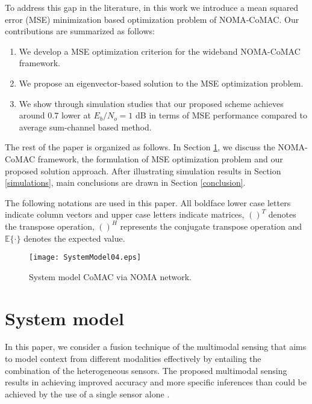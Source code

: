 \documentclass[journal]{IEEEtran}
\theoremstyle{definition}
\begin{document}
To address this gap in the literature, in this work we introduce a mean squared error (MSE) minimization based optimization problem of NOMA-CoMAC. Our contributions are summarized as follows:
      \vspace{-0.0cm}
      \begin{enumerate}[label=(\arabic*)]
\item  We develop a MSE optimization criterion for the wideband NOMA-CoMAC framework.
\item We propose an eigenvector-based solution to the MSE optimization problem. 
\item We show through simulation studies that our proposed scheme achieves around $0.7$ lower at $E_b/N_o = 1$ dB in terms of MSE performance compared to average sum-channel based method.
\end{enumerate}

	The rest of the paper is organized as follows. In Section \ref{SystemModel}, we discuss the NOMA-CoMAC framework, the formulation of MSE optimization problem and our proposed solution approach. After illustrating simulation results in Section \ref{simulations}, main conclusions are drawn in Section \ref{conclusion}.
	
	The following notations are used in this paper. All boldface lower
	case letters indicate column vectors and upper case letters indicate
	matrices, $()^T$ denotes the transpose operation, $()^H$ represents the conjugate transpose operation and $\mathbb{E} \{ \cdot \}$ denotes the expected value.
%	


	\begin{figure*}
		\centering
		\texttt{[image: SystemModel04.eps]}
		\centering \caption{System model CoMAC via NOMA network.} \label{CoMACSystem01}
		\vspace{-0.2cm}
	\end{figure*}
	
	\section{System model}
	\label{SystemModel}
	 In this paper, we consider a fusion technique of the multimodal sensing that aims to model context from different modalities effectively by entailing the combination of the heterogeneous sensors. The proposed multimodal sensing results in achieving improved accuracy and more specific inferences than could be achieved by the use of a single sensor alone \cite{Castanedo2013}. 
	
\end{document}
